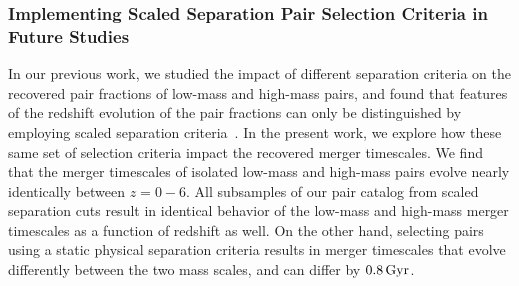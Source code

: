 \documentclass[twocolumn,linenumbers]{aastex631}
\begin{document}
        \subsubsection{Implementing Scaled Separation Pair Selection Criteria in Future Studies}
            In our previous work, we studied the impact of different separation criteria on the recovered pair fractions of low-mass and high-mass pairs, and found that features of the redshift evolution of the pair fractions can only be distinguished by employing scaled separation criteria~\citep{Chamberlain2024}. 
            In the present work, we explore how these same set of selection criteria impact the recovered merger timescales. 
            We find that the merger timescales of isolated low-mass and high-mass pairs evolve nearly identically between $z=0-6$.
            All subsamples of our pair catalog from scaled separation cuts result in identical behavior of the low-mass and high-mass merger timescales as a function of redshift as well. 
            On the other hand, selecting pairs using a static physical separation criteria results in merger timescales that evolve differently between the two mass scales, and can differ by $0.8\mathrm{\,Gyr}$. 
            
            
\end{document}
